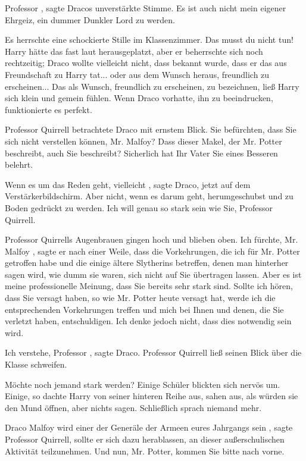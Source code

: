 \glqq Professor\grqq{} , sagte Dracos unverstärkte Stimme. \glqq Es ist auch
nicht mein eigener Ehrgeiz, ein dummer Dunkler Lord zu werden.\grqq{}

Es herrschte eine schockierte Stille im Klassenzimmer. Das musst du nicht tun!
Harry hätte das fast laut herausgeplatzt, aber er beherrschte sich noch
rechtzeitig; Draco wollte vielleicht nicht, dass bekannt wurde, dass er das aus
Freundschaft zu Harry tat... oder aus dem Wunsch heraus, freundlich zu
erscheinen... Das als Wunsch, freundlich zu erscheinen, zu bezeichnen, ließ
Harry sich klein und gemein fühlen. Wenn Draco vorhatte, ihn zu beeindrucken,
funktionierte es perfekt.

Professor Quirrell betrachtete Draco mit ernstem Blick. \glqq Sie befürchten,
dass Sie sich nicht verstellen können, Mr. Malfoy? Dass dieser Makel, der Mr.
Potter beschreibt, auch Sie beschreibt? Sicherlich hat Ihr Vater Sie eines
Besseren belehrt.\grqq{}

\glqq Wenn es um das Reden geht, vielleicht\grqq{} , sagte Draco, jetzt auf dem
Verstärkerbildschirm. \glqq Aber nicht, wenn es darum geht, herumgeschubst und
zu Boden gedrückt zu werden. Ich will genau so stark sein wie Sie, Professor
Quirrell.\grqq{}

Professor Quirrells Augenbrauen gingen hoch und blieben oben. \glqq Ich fürchte,
Mr. Malfoy\grqq{} , sagte er nach einer Weile, \glqq dass die Vorkehrungen, die
ich für Mr. Potter getroffen habe und die einige ältere Slytherins betreffen,
denen man hinterher sagen wird, wie dumm sie waren, sich nicht auf Sie
übertragen lassen. Aber es ist meine professionelle Meinung, dass Sie bereits
sehr stark sind. Sollte ich hören, dass Sie versagt haben, so wie Mr. Potter
heute versagt hat, werde ich die entsprechenden Vorkehrungen treffen und mich
bei Ihnen und denen, die Sie verletzt haben, entschuldigen. Ich denke jedoch
nicht, dass dies notwendig sein wird.\grqq{}

\glqq Ich verstehe, Professor\grqq{} , sagte Draco. Professor Quirrell ließ
seinen Blick über die Klasse schweifen.

\glqq Möchte noch jemand stark werden?\grqq{} Einige Schüler blickten sich
nervös um. Einige, so dachte Harry von seiner hinteren Reihe aus, sahen aus, als
würden sie den Mund öffnen, aber nichts sagen. Schließlich sprach niemand mehr.

\glqq Draco Malfoy wird einer der Generäle der Armeen eures Jahrgangs
sein\grqq{} , sagte Professor Quirrell, \glqq sollte er sich dazu herablassen,
an dieser außerschulischen Aktivität teilzunehmen. Und nun, Mr. Potter, kommen
Sie bitte nach vorne.\grqq{}

